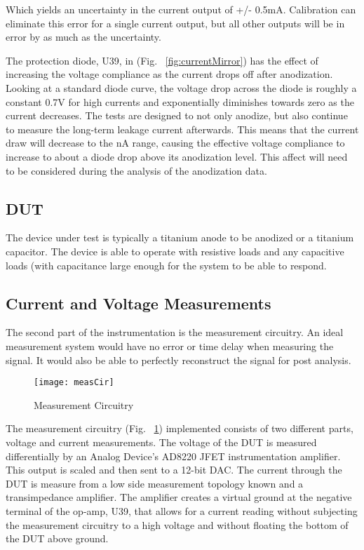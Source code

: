 Which yields an uncertainty in the current output of +/- 0.5mA. Calibration can eliminate this error for a single current output, but all other outputs will be in error by as much as the uncertainty.

The protection diode, U39, in (Fig. ~\ref{fig:currentMirror}) has the effect of increasing the voltage compliance as the current drops off after anodization. Looking at a standard diode curve, the voltage drop across the diode is roughly a constant 0.7V for high currents and exponentially diminishes towards zero as the current decreases. The tests are designed to not only anodize, but also continue to measure the long-term leakage current afterwards. This means that the current draw will decrease to the nA range, causing the effective voltage compliance to increase to about a diode drop above its anodization level. This affect will need to be considered during the analysis of the anodization data.

\subsection{DUT}

The device under test is typically a titanium anode to be anodized or a titanium capacitor. The device is able to operate with resistive loads and any capacitive loads (with capacitance large enough for the system to be able to respond.


\subsection{Current and Voltage Measurements}

The second part of the instrumentation is the measurement circuitry. An ideal measurement system would have no error or time delay when measuring the signal. It would also be able to perfectly reconstruct the signal for post analysis. 


\begin{figure}[here]
\centering
\texttt{[image: measCir]}
\caption{Measurement Circuitry}
\label{fig:measCir}
\end{figure}

The measurement circuitry (Fig. ~\ref{fig:measCir}) implemented consists of two different parts, voltage and current measurements. The voltage of the DUT is measured differentially by an Analog Device’s AD8220 JFET instrumentation amplifier. This output is scaled and then sent to a 12-bit DAC. The current through the DUT is measure from a low side measurement topology known and a transimpedance amplifier. The amplifier creates a virtual ground at the negative terminal of the op-amp, U39, that allows for a current reading without subjecting the measurement circuitry to a high voltage and without floating the bottom of the DUT above ground.

